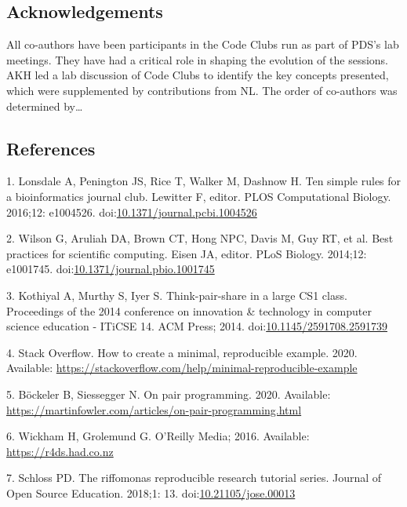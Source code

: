 \documentclass[11pt,]{article}
\begin{document}
\subsection{Acknowledgements}\label{acknowledgements}

All co-authors have been participants in the Code Clubs run as part of
PDS's lab meetings. They have had a critical role in shaping the
evolution of the sessions. AKH led a lab discussion of Code Clubs to
identify the key concepts presented, which were supplemented by
contributions from NL. The order of co-authors was determined by\ldots{}

\newpage

\subsection{References}\label{references}

\hypertarget{refs}{}
\hypertarget{ref-Lonsdale2016}{}
1. Lonsdale A, Penington JS, Rice T, Walker M, Dashnow H. Ten simple
rules for a bioinformatics journal club. Lewitter F, editor. PLOS
Computational Biology. 2016;12: e1004526.
doi:\href{https://doi.org/10.1371/journal.pcbi.1004526}{10.1371/journal.pcbi.1004526}

\hypertarget{ref-Wilson2014}{}
2. Wilson G, Aruliah DA, Brown CT, Hong NPC, Davis M, Guy RT, et al.
Best practices for scientific computing. Eisen JA, editor. PLoS Biology.
2014;12: e1001745.
doi:\href{https://doi.org/10.1371/journal.pbio.1001745}{10.1371/journal.pbio.1001745}

\hypertarget{ref-Kothiyal2014}{}
3. Kothiyal A, Murthy S, Iyer S. Think-pair-share in a large CS1 class.
Proceedings of the 2014 conference on innovation \& technology in
computer science education - ITiCSE 14. ACM Press; 2014.
doi:\href{https://doi.org/10.1145/2591708.2591739}{10.1145/2591708.2591739}

\hypertarget{ref-StackOverflow_MREE}{}
4. Stack Overflow. How to create a minimal, reproducible example. 2020.
Available:
\url{https://stackoverflow.com/help/minimal-reproducible-example}

\hypertarget{ref-Bockeler_2020}{}
5. Böckeler B, Siessegger N. On pair programming. 2020. Available:
\url{https://martinfowler.com/articles/on-pair-programming.html}

\hypertarget{ref-Wickham_2016}{}
6. Wickham H, Grolemund G. O'Reilly Media; 2016. Available:
\url{https://r4ds.had.co.nz}

\hypertarget{ref-Schloss_2018}{}
7. Schloss PD. The riffomonas reproducible research tutorial series.
Journal of Open Source Education. 2018;1: 13.
doi:\href{https://doi.org/10.21105/jose.00013}{10.21105/jose.00013}
\end{document}
